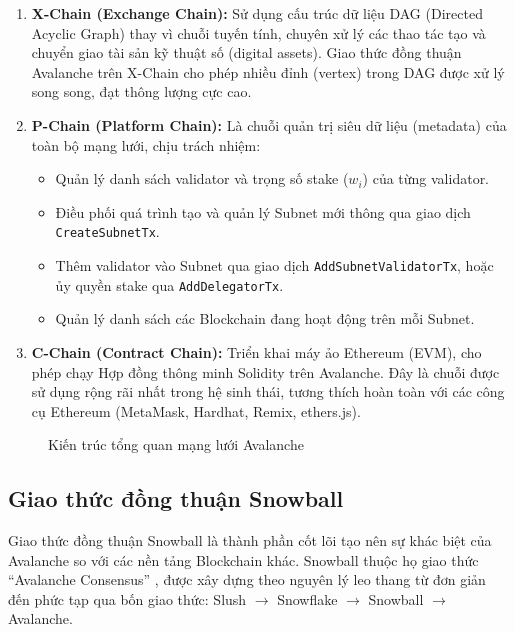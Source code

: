 \begin{enumerate}
    \item \textbf{X-Chain (Exchange Chain):} Sử dụng cấu trúc dữ liệu DAG (Directed Acyclic Graph) thay vì chuỗi tuyến tính, chuyên xử lý các thao tác tạo và chuyển giao tài sản kỹ thuật số (digital assets). Giao thức đồng thuận Avalanche trên X-Chain cho phép nhiều đỉnh (vertex) trong DAG được xử lý song song, đạt thông lượng cực cao.

    \item \textbf{P-Chain (Platform Chain):} Là chuỗi quản trị siêu dữ liệu (metadata) của toàn bộ mạng lưới, chịu trách nhiệm:
    \begin{itemize}
        \item Quản lý danh sách validator và trọng số stake ($w_i$) của từng validator.
        \item Điều phối quá trình tạo và quản lý Subnet mới thông qua giao dịch \texttt{CreateSubnetTx}.
        \item Thêm validator vào Subnet qua giao dịch \texttt{AddSubnetValidatorTx}, hoặc ủy quyền stake qua \texttt{AddDelegatorTx}.
        \item Quản lý danh sách các Blockchain đang hoạt động trên mỗi Subnet.
    \end{itemize}

    \item \textbf{C-Chain (Contract Chain):} Triển khai máy ảo Ethereum (EVM), cho phép chạy Hợp đồng thông minh Solidity trên Avalanche. Đây là chuỗi được sử dụng rộng rãi nhất trong hệ sinh thái, tương thích hoàn toàn với các công cụ Ethereum (MetaMask, Hardhat, Remix, ethers.js).
\end{enumerate}

\begin{figure}[H]
\centering
{}
\caption{Kiến trúc tổng quan mạng lưới Avalanche}
\label{fig:avalanche_arch}
\end{figure}

\subsection{Giao thức đồng thuận Snowball}

Giao thức đồng thuận Snowball là thành phần cốt lõi tạo nên sự khác biệt của Avalanche so với các nền tảng Blockchain khác. Snowball thuộc họ giao thức ``Avalanche Consensus'' \cite{rocket2020avalanche}, được xây dựng theo nguyên lý leo thang từ đơn giản đến phức tạp qua bốn giao thức: Slush $\rightarrow$ Snowflake $\rightarrow$ Snowball $\rightarrow$ Avalanche.

